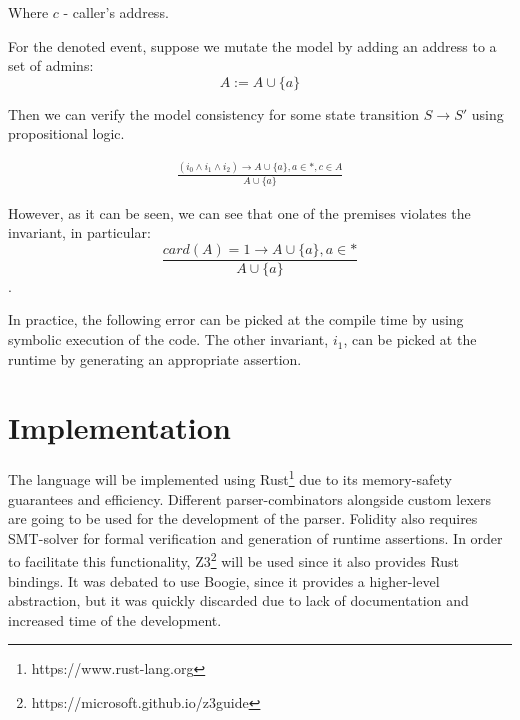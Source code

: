 \documentclass[oneside]{ecsproject}     %
\begin{document}
Where $c$ - caller's address.

For the denoted event, suppose we mutate the model by adding an address to a set of admins:
\begin{equation*}
  A := A \cup \{a\}
\end{equation*}

Then we can verify the model consistency for some state transition $S \to S'$ using propositional logic.

\begin{equation*}
  \begin{gathered} 
   \frac{(i_0 \wedge i_1 \wedge i_2 ) \rightarrow A \cup \{a\}, a \in *, c \in A}{A \cup \{a\}}
  \end{gathered}
\end{equation*}

However, as it can be seen, we can see that one of the premises violates the invariant, in particular:
\begin{equation*}
  \frac{card(A) = 1 \rightarrow A \cup \{a\}, a \in *}{A \cup \{a\}}
\end{equation*}.

In practice, the following error can be picked at the compile time by using symbolic execution of the code.
The other invariant, $i_1$, can be picked at the runtime by generating an appropriate assertion.

\section{Implementation}

The language will be implemented using Rust\footnote{https://www.rust-lang.org} due to its memory-safety guarantees and efficiency. 
Different parser-combinators alongside custom lexers are going to be used for the development of the parser. 
Folidity also requires SMT-solver for formal verification and generation of runtime assertions. In order to facilitate this functionality,
Z3\footnote{https://microsoft.github.io/z3guide} will be used since it also provides Rust bindings. It was debated to use Boogie, since it provides
a higher-level abstraction, but it was quickly discarded due to lack of documentation and increased time of the development.
\end{document}
